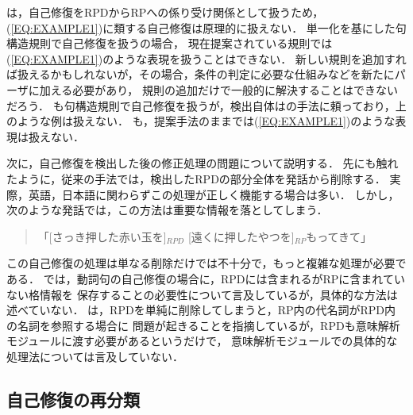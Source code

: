 \cite{DY1997}は，自己修復をRPDからRPへの係り受け関係として扱うため，(\ref{EQ:EXAMPLE1})に類する自己修復は原理的に扱えない．
単一化を基にした句構造規則で自己修復を扱う\cite{NM1998}の場合，
現在提案されている規則では(\ref{EQ:EXAMPLE1})のような表現を扱うことはできない．
新しい規則を追加すれば扱えるかもしれないが，その場合，条件の判定に必要な仕組みなどを新たにパーザに加える必要があり，
規則の追加だけで一般的に解決することはできないだろう．
\cite{CM1999}も句構造規則で自己修復を扱うが，検出自体は\cite{HP1997}の手法に頼っており，上のような例は扱えない．
\cite{SY1994,IM1996}も，提案手法のままでは(\ref{EQ:EXAMPLE1})のような表現は扱えない．

次に，自己修復を検出した後の修正処理の問題について説明する．
先にも触れたように，従来の手法では，検出したRPDの部分全体を発話から削除する．
実際，英語，日本語に関わらずこの処理が正しく機能する場合は多い．
しかし，次のような発話では，この方法は重要な情報を落としてしまう．
\begin{quote}
  「[さっき押した赤い玉を]$_{RPD}$ [遠くに押したやつを]$_{RP}$もってきて」
\end{quote}
この自己修復の処理は単なる削除だけでは不十分で，もっと複雑な処理が必要である．
\cite{IM1996}では，動詞句の自己修復の場合に，RPDには含まれるがRPに含まれていない格情報を
保存することの必要性について言及しているが，具体的な方法は述べていない．
\cite{CM1999}は，RPDを単純に削除してしまうと，RP内の代名詞がRPD内の名詞を参照する場合に
問題が起きることを指摘しているが，RPDも意味解析モジュールに渡す必要があるというだけで，
意味解析モジュールでの具体的な処理法については言及していない．

\subsection{自己修復の再分類}\label{subsec:re-categorize}

